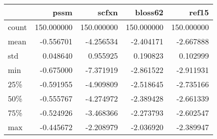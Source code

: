 \begin{tabular}{lrrrr}
\toprule
{} &        pssm &       scfxn &     bloss62 &       ref15 \\
\midrule
count &  150.000000 &  150.000000 &  150.000000 &  150.000000 \\
mean  &   -0.556701 &   -4.256534 &   -2.404171 &   -2.667888 \\
std   &    0.048640 &    0.955925 &    0.190823 &    0.102999 \\
min   &   -0.675000 &   -7.371919 &   -2.861522 &   -2.911931 \\
25\%   &   -0.591955 &   -4.909809 &   -2.518645 &   -2.735166 \\
50\%   &   -0.555767 &   -4.274972 &   -2.389428 &   -2.661339 \\
75\%   &   -0.524926 &   -3.468366 &   -2.273793 &   -2.602547 \\
max   &   -0.445672 &   -2.208979 &   -2.036920 &   -2.389947 \\
\bottomrule
\end{tabular}
